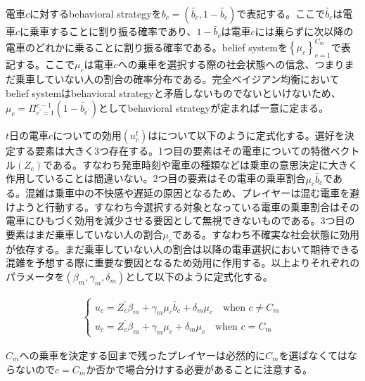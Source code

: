 \documentclass{jsarticle}
\begin{document}
電車$c$に対するbehavioral strategyを$b_c = (\tilde{b_c}, 1 - \tilde{b_c})$で表記する。ここで$\tilde{b_c}$は電車$c$に乗車することに割り振る確率であり、$1 - \tilde{b_c}$は電車$c$には乗らずに次以降の電車のどれかに乗ることに割り振る確率である。belief systemを$\left\{ \mu_c \right\}_{c = 1}^{C_m}$で表記する。ここで$\mu_c$は電車$c$への乗車を選択する際の社会状態への信念、つまりまだ乗車していない人の割合の確率分布である。完全ベイジアン均衡においてbelief systemはbehavioral strategyと矛盾しないものでないといけないため、$\mu_c = \Pi_{c^{'} = 1}^{c-1} (1 - \tilde{b_{c^{'}}})$としてbehavioral strategyが定まれば一意に定まる。

$t$日の電車$c$についての効用$(u_c^t)$はについて以下のように定式化する。選好を決定する要素は大きく3つ存在する。1つ目の要素はその電車についての特徴ベクトル$(Z_c)$である。すなわち発車時刻や電車の種類などは乗車の意思決定に大きく作用していることは間違いない。2つ目の要素はその電車の乗車割合$\mu_c \tilde{b_c}$である。混雑は乗車中の不快感や遅延の原因となるため、プレイヤーは混む電車を避けようと行動する。すなわち今選択する対象となっている電車の乗車割合はその電車にひもづく効用を減少させる要因として無視できないものである。3つ目の要素はまだ乗車していない人の割合$\mu_c$である。すなわち不確実な社会状態に効用が依存する。まだ乗車していない人の割合は以降の電車選択において期待できる混雑を予想する際に重要な要因となるため効用に作用する。以上よりそれぞれのパラメータを$(\beta_m, \gamma_m, \delta_m)$として以下のように定式化する。

\begin{align*}
	\begin{cases}
	u_c = Z_c^{'} \beta_m + \gamma_m \mu_{c} \tilde{b_c} + \delta_m \mu_c\quad \text{when $c \neq C_m$}\\[8pt]
	u_{c} = Z_c^{'} \beta_m + \gamma_m \mu_{c} + \delta_m \mu_c\quad \text{when $c = C_m$}
	\end{cases}
\end{align*}

$C_m$への乗車を決定する回まで残ったプレイヤーは必然的に$C_m$を選ばなくてはならないので$c = C_m$か否かで場合分けする必要があることに注意する。
\end{document}
